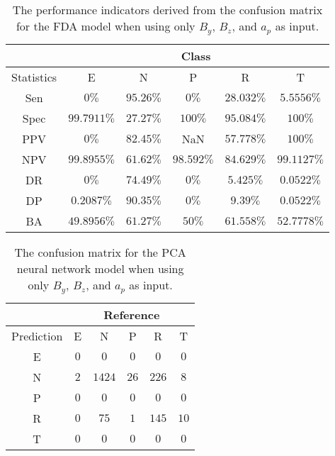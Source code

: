 \begin{table}[!ht]
	\centering
	\begin{tabular}{|c|c|c|c|c|c|}
		\hline
		 & \multicolumn{5}{c|}{Class} \\ \hline
		Statistics & E & N & P & R & T \\ \hline
		Sen & $0\%$ & $95.26\%$ & $0\%$ & $28.032\%$ & $5.5556\%$ \\ \hline
		Spec & $99.7911\%$ & $27.27\%$ & $100\%$ & $95.084\%$ & $100\%$ \\ \hline
		PPV & $0\%$ & $82.45\%$ & NaN & $57.778\%$ & $100\%$ \\ \hline
		NPV & $99.8955\%$ & $61.62\%$ & $98.592\%$ & $84.629\%$ & $99.1127\%$ \\ \hline
		DR & $0\%$ & $74.49\%$ & $0\%$ & $5.425\%$ & $0.0522\%$ \\ \hline
		DP & $0.2087\%$ & $90.35\%$ & $0\%$ & $9.39\%$ & $0.0522\%$ \\ \hline
		BA & $49.8956\%$ & $61.27\%$ & $50\%$ & $61.558\%$ & $52.7778\%$ \\ \hline
	\end{tabular}
	\caption{The performance indicators derived from the confusion matrix for the FDA model when using only $B_{y}$, $B_{z}$, and $a_{p}$ as input.}
	\label{tab:cs:reverse:yzap:fda}
\end{table}

\begin{table}[!ht]
	\centering
	\begin{tabular}{|c|c|c|c|c|c|}
		\hline
		 & \multicolumn{5}{|c|}{Reference} \\ \hline
		 Prediction & E & N & P & R & T \\ \hline
		 E & $0$ & $0$ & $0$ & $0$ & $0$ \\ \hline
		 N & $2$ & $1424$ & $26$ & $226$ & $8$ \\ \hline
		 P & $0$ & $0$ & $0$ & $0$ & $0$ \\ \hline
		 R & $0$ & $75$ & $1$ & $145$ & $10$ \\ \hline
		 T & $0$ & $0$ & $0$ & $0$ & $0$ \\ \hline
	\end{tabular}
	\caption{The confusion matrix for the PCA neural network model when using only $B_{y}$, $B_{z}$, and $a_{p}$ as input.}
	\label{tab:cm:yzap:pcaNNet}
\end{table}

